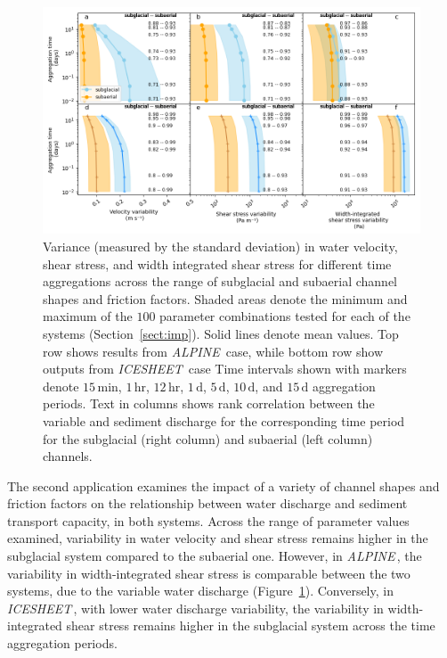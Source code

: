 \documentclass[draft]{agujournal2019}
\newcommand{\alpine}{\textit{ALPINE}\,}
\newcommand{\icesheet}{\textit{ICESHEET}\,}
\newcommand{\unit}[1]{$\mathrm{#1}$}
\begin{document}
\begin{figure}[h]
  \centering
    \includegraphics[width=0.9\linewidth]{Fig4.png}
    \caption{Variance (measured by the standard deviation) in water velocity, shear stress, and width integrated shear stress for different time aggregations across the range of subglacial and subaerial channel shapes and friction factors.
      Shaded areas denote the minimum and maximum of the $100$ parameter combinations tested for each of the systems (Section~\ref{sect:imp}).
      Solid lines denote  mean values.
      Top row shows results from \alpine{} case, while bottom row show outputs from \icesheet{} case
      Time intervals shown with markers denote $15$\,\unit{min}, $1$\,\unit{hr}, $12$\,\unit{hr}, $1$\,\unit{d}, $5$\,\unit{d}, $10$\,\unit{d}, and $15$\,\unit{d} aggregation periods.
      Text in columns shows rank correlation between the variable and sediment discharge for the corresponding time period for the subglacial (right column) and subaerial (left column) channels.
    }
    \label{fig:multi_run}
  \end{figure}

The second application examines the impact of a variety of channel shapes and friction factors on the relationship between water discharge and sediment transport capacity, in both systems.
Across the range of parameter values examined, variability in water velocity and shear stress remains higher in the subglacial system compared to the subaerial one.
However, in \alpine{}, the variability in width-integrated shear stress is comparable between the two systems, due to the variable water discharge (Figure~\ref{fig:multi_run}).
Conversely, in \icesheet{}, with lower water discharge variability, the variability in width-integrated shear stress remains higher in the subglacial system across the time aggregation periods.
\end{document}
